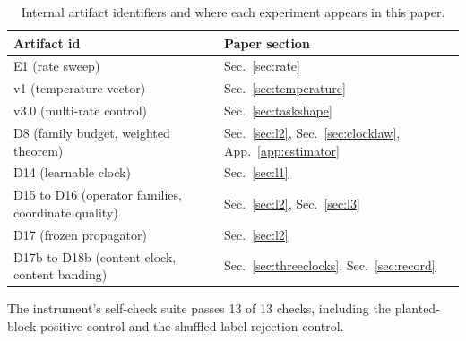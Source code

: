\documentclass[11pt]{article}
\begin{document}
\begin{table}[h]
\centering
\caption{Internal artifact identifiers and where each experiment appears in this paper.}
\label{tab:idmap}
\begin{tabular}{ll}
\toprule
Artifact id & Paper section \\
\midrule
E1 (rate sweep) & Sec.~\ref{sec:rate} \\
v1 (temperature vector) & Sec.~\ref{sec:temperature} \\
v3.0 (multi-rate control) & Sec.~\ref{sec:taskshape} \\
D8 (family budget, weighted theorem) & Sec.~\ref{sec:l2}, Sec.~\ref{sec:clocklaw}, App.~\ref{app:estimator} \\
D14 (learnable clock) & Sec.~\ref{sec:l1} \\
D15 to D16 (operator families, coordinate quality) & Sec.~\ref{sec:l2}, Sec.~\ref{sec:l3} \\
D17 (frozen propagator) & Sec.~\ref{sec:l2} \\
D17b to D18b (content clock, content banding) & Sec.~\ref{sec:threeclocks}, Sec.~\ref{sec:record} \\
\bottomrule
\end{tabular}
\end{table}

The instrument's self-check suite passes 13 of 13 checks, including the planted-block positive control and the shuffled-label rejection control.
\end{document}
